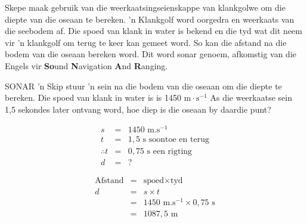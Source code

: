 \begin{minipage}{.5\textwidth}
\begin{figure}[H]
\begin{center}
\end{center}
\end{figure}       
\end{minipage}
\begin{minipage}{.5\textwidth}
Skepe maak gebruik van die weer\-kaats\-ings\-ei\-en\-skap\-pe van klankgolwe om die diepte van die oseaan te bereken. 'n Klankgolf word oorgedra en weerkaats van die seebodem af. Die spoed van klank in water is bekend en die tyd wat dit neem vir 'n klankgolf om terug te keer kan gemeet word. So kan die afstand na die bodem van die oseaan bereken word. Dit word sonar genoem, afkomstig van die Engels vir \textbf{So}und \textbf{N}avigation \textbf{A}nd \textbf{R}anging.\par    
 \end{minipage}
            

\begin{wex}{SONAR}{ 'n Skip stuur 'n sein na die bodem van die oseaan om die diepte te bereken. Die spoed van klank in water is is 1450 $\text{m}\cdot\text{s}^{-1}$ As die weerkaatse sein 1,5 sekondes later ontvang word, hoe diep is die oseaan by daardie punt?}{
\begin{eqnarray*}
s &=& 1450  \text{ m.s}^{-1}\\
t &=& 1,5  \text{ s}  \text{ soontoe  en  terug}\\
\therefore t &= & 0,75 \text{ s}  \text{ een rigting}\\
d &=& ?
\end{eqnarray*}

\begin{eqnarray*}
\text{Afstand} &=& \text{spoed} \times \text{tyd} \\
d &=& s \times t \\
&=& 1450 \text{ m.s}^{-1} \times 0,75 \text{ s} \\
&=& 1087,5  \text{ m}
\end{eqnarray*}
}
\end{wex}
          
